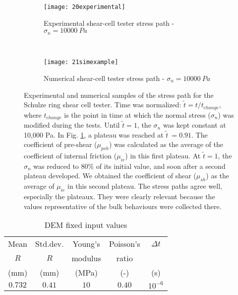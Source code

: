 \documentclass[review]{elsarticle}
\begin{document}
\begin{figure}[htp] \centering
    \begin{subfigure}[b]{0.96\columnwidth}
        \texttt{[image: 20experimental]}
        \caption{Experimental shear-cell tester stress path - $\sigma_n = 10000
        ~Pa$}
        \label{fig:20experimental} 
    \end{subfigure}\\
        \begin{subfigure}[b]{0.96\columnwidth}
        \texttt{[image: 21simexample]}
        \caption{Numerical shear-cell tester stress path - $\sigma_n = 10000
        ~Pa$}
        \label{fig:21simexample} 
    \end{subfigure}
    \caption[Stress path]{Experimental and numerical samples of the stress path
    for the Schulze ring shear cell tester.
	Time was normalized: $\tilde{t} = t/t_{change}$, where $t_{change}$ is the
	point in time at which the normal stress ($\sigma_n$) was modified during the
	tests.
	Until $\tilde{t}=1$, the $\sigma_n$ was kept constant at 10,000 Pa. 
	In Fig. \ref{fig:20experimental}, 
 	a plateau was reached at $\tilde{t}~=0.91$.
	The coefficient of pre-shear ($\mu_{psh}$) was calculated as the average of the
	coefficient of internal friction ($\mu_{ie}$) in this first plateau.
	At $\tilde{t}=1$, the $\sigma_n$ was reduced to $80 \%$ of its initial
	value, and soon after
	a second plateau developed.
	We obtained the coefficient of
	shear ($ \mu_{sh}$) as the average of $\mu_{ie}$ in this second plateau.
	The stress paths agree well, especially the plateaux.
	They were clearly relevant because
	the values representative of the bulk behaviours 
	were collected there.}
    \label{fig:40experimentalsimulation}
\end{figure}
\begin{table}[h]
\centering
\begin{tabular}{ccccc}
\hline
    Mean & Std.dev.  & Young's & Poisson's & $\Delta t$\\
    $R$ & $R$ & modulus & ratio & \\
    (mm)  & (mm)  & (MPa) & (-) & (s)\\
    \hline
    $0.732$ & $0.41$ & $10$    & $0.40$ & $10^{-6}$\\
\hline
\end{tabular}
\caption{DEM fixed input values}
\label{tab:09DEMFixedinputvalues}
\end{table}
\end{document}
